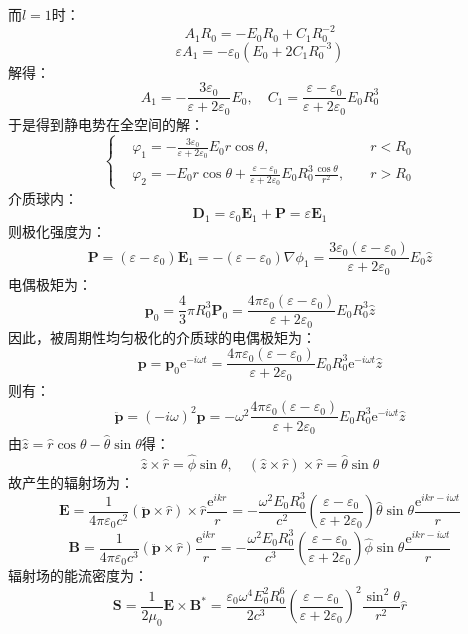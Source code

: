 \documentclass[a4paper,fontset=none]{ctexart}
\begin{document}
\begin{itemize}
        而$l=1$时：
        \[
            A_1R_0 = -E_0R_0 + C_1R_0^{-2}
        \]
        \[
            \varepsilon A_1 = -\varepsilon_0 (E_0 + 2C_1R_0^{-3})
        \]
        解得：
        \[
            A_1 = -\frac{3\varepsilon_0}{\varepsilon+2\varepsilon_0}E_0,\quad C_1 = \frac{\varepsilon-\varepsilon_0}{\varepsilon+2\varepsilon_0}E_0R_0^3
        \]
        于是得到静电势在全空间的解：
        \[
        \left\{
            \begin{aligned}
                &\varphi_1 = -\frac{3\varepsilon_0}{\varepsilon+2\varepsilon_0}E_0r\cos\theta,\quad &r<R_0 \\
                &\varphi_2 = -E_0r\cos\theta + \frac{\varepsilon-\varepsilon_0}{\varepsilon+2\varepsilon_0}E_0R_0^3\frac{\cos\theta}{r^2},\quad &r>R_0
            \end{aligned}
        \right.
        \]
        介质球内：
        \[
            \bm{D}_1 = \varepsilon_0\bm{E}_1 + \bm{P} = \varepsilon\bm{E}_1
        \]
        则极化强度为：
        \[
            \bm{P} = (\varepsilon - \varepsilon_0)\bm{E}_1 = -(\varepsilon - \varepsilon_0)\nabla\phi_1 = \frac{3\varepsilon_0(\varepsilon-\varepsilon_0)}{\varepsilon+2\varepsilon_0}E_0\hat{z}
        \]
        电偶极矩为：
        \[
            \bm{p}_0 = \frac{4}{3}\pi R_0^3\bm{P}_0 = \frac{4\pi\varepsilon_0(\varepsilon-\varepsilon_0)}{\varepsilon+2\varepsilon_0}E_0R_0^3\hat{z}
        \]
        因此，被周期性均匀极化的介质球的电偶极矩为：
        \[
            \bm{p} = \bm{p}_0\mathrm{e}^{-i\omega t} = \frac{4\pi\varepsilon_0(\varepsilon-\varepsilon_0)}{\varepsilon+2\varepsilon_0}E_0R_0^3\mathrm{e}^{-i\omega t}\hat{z}
        \]
        则有：
        \[
            \ddot{\bm{p}} = (-i\omega)^2\bm{p} = -\omega^2\frac{4\pi\varepsilon_0(\varepsilon-\varepsilon_0)}{\varepsilon+2\varepsilon_0}E_0R_0^3\mathrm{e}^{-i\omega t}\hat{z}
        \]
        由$\hat{z}=\hat{r}\cos\theta-\hat{\theta}\sin\theta$得：
        \[
            \hat{z} \times \hat{r} = \hat{\phi}\sin\theta,\quad
            (\hat{z} \times \hat{r}) \times \hat{r} = \hat{\theta}\sin\theta
        \]
        故产生的辐射场为：
        \[
            \bm{E} = \frac{1}{4\pi\varepsilon_0c^2}(\ddot{\bm{p}} \times \hat{r}) \times \hat{r} \frac{\mathrm{e}^{ikr}}{r} = -\frac{\omega^2E_0R_0^3}{c^2} \left(\frac{\varepsilon-\varepsilon_0}{\varepsilon+2\varepsilon_0}\right) \hat{\theta}\sin\theta \frac{\mathrm{e}^{ikr-i\omega t}}{r}
        \]
        \[
            \bm{B} = \frac{1}{4\pi\varepsilon_0c^3}(\ddot{\bm{p}} \times \hat{r}) \frac{\mathrm{e}^{ikr}}{r} = -\frac{\omega^2E_0R_0^3}{c^3} \left(\frac{\varepsilon-\varepsilon_0}{\varepsilon+2\varepsilon_0}\right) \hat{\phi}\sin\theta \frac{\mathrm{e}^{ikr-i\omega t}}{r}
        \]
        辐射场的能流密度为：
        \[
            \bm{S} = \frac{1}{2\mu_0}\bm{E} \times \bm{B}^* = \frac{\varepsilon_0\omega^4E_0^2R_0^6}{2c^3} \left(\frac{\varepsilon-\varepsilon_0}{\varepsilon+2\varepsilon_0}\right)^2 \frac{\sin^2\theta}{r^2}\hat{r}
        \]

    \end{itemize}
\end{document}
